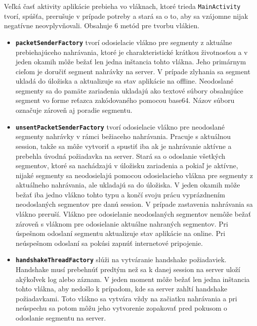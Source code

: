 Veľká časť aktivity aplikácie prebieha vo vláknach, ktoré trieda \texttt{MainActivity} tvorí, spúšťa, prerušuje v prípade potreby a stará sa o to, aby sa vzájomne nijak negatívne neovplyvňovali. Obsahuje 6 metód pre tvorbu vlákien.
\begin{itemize}
 \item{\texttt{\textbf{packetSenderFactory}} tvorí odosielacie vlákno pre segmenty z aktuálne prebiehajúceho nahrávania, ktoré je charakteristické krátkou životnosťou a v jeden okamih môže bežať len jedna inštancia tohto vlákna. Jeho primárnym cieľom je doručiť segment nahrávky na server. V prípade zlyhania sa segment ukladá do úložiska a aktualizuje sa stav aplikácie na offline. Neodoslané segmenty sa do pamäte zariadenia ukladajú ako textové súbory obsahujúce segment vo forme reťazca zakódovaného pomocou base64. Názov súboru označuje zároveň aj poradie segmentu.}

 \item{\texttt{\textbf{unsentPacketSenderFactory}} tvorí odosielacie vlákno pre neodoslané segmenty nahrávky v rámci bežiaceho nahrávania. Pracuje s aktuálnou session, takže sa môže vytvoriť a spustiť iba ak je nahrávanie aktívne a prebehla úvodná požiadavka na server. Stará sa o odoslanie všetkých segmentov, ktoré sa nachádzajú v úložisku zariadenia a pokiaľ je aktívne, nijaké segmenty sa neodosielajú pomocou odosielacieho vlákna pre segmenty z aktuálneho nahrávania, ale ukladajú sa do úložiska. V jeden okamih môže bežať iba jedno vlákno tohto typu a končí svoju prácu vyprázdnením neodoslaných segmentov pre danú session. V prípade zastavenia nahrávania sa vlákno preruší. Vlákno pre odosielanie neodoslaných segmentov nemôže bežať zároveň s vláknom pre odosielanie aktuálne nahraných segmentov. Pri úspešnom odoslaní segmentu aktualizuje stav aplikácie na online. Pri neúspešnom odoslaní sa pokúsi zapnúť internetové pripojenie.}
 
  \item{\texttt{\textbf{handshakeThreadFactory}} slúži na vytváranie handshake požiadaviek. Handshake musí prebehnúť predtým než sa k danej session na server uloží akýkoľvek log alebo záznam. V jeden moment môže bežať len jedna inštancia tohto vlákna, aby nedošlo k prípadom, kde sa server zahltí handshake požiadavkami. Toto vlákno sa vytvára vždy na začiatku nahrávania a pri neúspechu sa potom môžu jeho vytvorenie zopakovať pred pokusom o odoslanie segmentu na server.}



\end{itemize}
